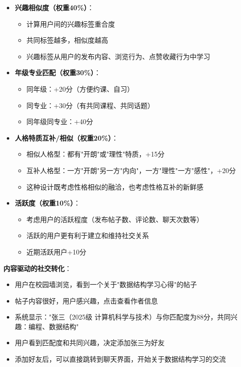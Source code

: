 \documentclass[12pt,a4paper]{article}
\begin{document}
\begin{itemize}
    \item \textbf{兴趣相似度（权重40\%）}：
        \begin{itemize}
            \item 计算用户间的兴趣标签重合度
            \item 共同标签越多，相似度越高
            \item 兴趣标签从用户的发布内容、浏览行为、点赞收藏行为中学习
        \end{itemize}
    \item \textbf{年级专业匹配（权重30\%）}：
        \begin{itemize}
            \item 同年级：+20分（方便约课、自习）
            \item 同专业：+30分（有共同课程、共同话题）
            \item 同年级同专业：+40分
        \end{itemize}
    \item \textbf{人格特质互补/相似（权重20\%）}：
        \begin{itemize}
            \item 相似人格型：都有"开朗"或"理性"特质，+15分
            \item 互补人格型：一方"开朗"另一方"内向"，一方"理性"一方"感性"，+20分
            \item 这种设计既考虑性格相似的融洽，也考虑性格互补的新鲜感
        \end{itemize}
    \item \textbf{活跃度（权重10\%）}：
        \begin{itemize}
            \item 考虑用户的活跃程度（发布帖子数、评论数、聊天次数等）
            \item 活跃的用户更有利于建立和维持社交关系
            \item 近期活跃用户+10分
        \end{itemize}
\end{itemize}

\textbf{内容驱动的社交转化}：
\begin{itemize}
    \item 用户在校园墙浏览，看到一个关于"数据结构学习心得"的帖子
    \item 帖子内容很好，用户感兴趣，点击查看作者信息
    \item 系统显示："张三（2025级 计算机科学与技术）与你匹配度为88分，共同兴趣：编程、数据结构"
    \item 用户看到匹配度和共同兴趣，决定添加张三为好友
    \item 添加好友后，可以直接跳转到聊天界面，开始关于数据结构学习的交流
\end{itemize}
\end{document}

